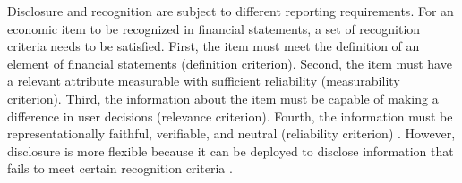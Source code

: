 \documentclass[letterpaper,11pt]{article}
\begin{document}
\begin{spacing}{1.5}
Disclosure and recognition are subject to different reporting requirements. For an economic item to be recognized in financial statements, a set of recognition criteria needs to be satisfied. First, the item must meet the definition of an element of financial statements (definition criterion). Second, the item must have a relevant attribute measurable with sufficient reliability (measurability criterion). Third, the information about the item must be capable of making a difference in user decisions (relevance criterion). Fourth, the information must be representationally faithful, verifiable, and neutral (reliability criterion) \cite{fasbStatementFinancialAccounting1984}. However, disclosure is more flexible because it can be deployed to disclose information that fails to meet certain recognition criteria \cite[par. 7b]{fasbStatementFinancialAccounting1984}. 


\end{spacing}
\end{document}
